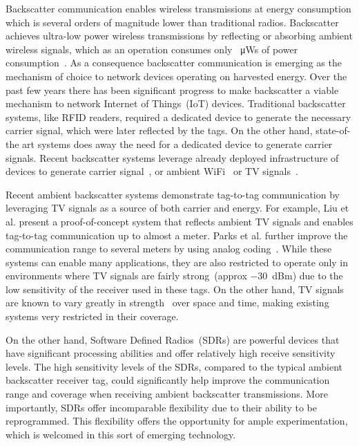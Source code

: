 Backscatter communication enables wireless transmissions
at energy consumption which is several orders of magnitude
lower than traditional radios. Backscatter achieves ultra-low
power wireless transmissions by reflecting or absorbing ambient
wireless signals, which as an operation consumes only 
\SI{}{\micro\watt}s of power consumption~\cite{liu_ambient_2013}. 
As a consequence backscatter
communication is emerging as the mechanism of choice to network
devices operating on harvested energy.  
Over the past few years there has been significant progress
to make backscatter a viable mechanism to network Internet of
Things~(IoT) devices. Traditional backscatter systems, like RFID readers, required a
dedicated device to generate the necessary carrier signal, which were later
reflected by the tags. On the other hand, state-of-the art systems 
does away the need for a dedicated device to generate carrier signals. 
Recent backscatter systems leverage already deployed infrastructure of
devices to generate carrier signal~\cite{varshney2016lorea,iyer2016inter}, or ambient WiFi~\cite{zhang2016hitchhike,kellogg2015wi} or TV
signals~\cite{liu_ambient_2013,parks_turbocharging_2014}.

Recent ambient backscatter systems demonstrate tag-to-tag communication
by leveraging TV signals as a source of both carrier and energy. For
example, Liu et al. present a proof-of-concept system that reflects
ambient TV signals and enables tag-to-tag communication up to almost a
meter. Parks et al. further improve the communication range to several
meters by using analog coding~\cite{parks_turbocharging_2014}. While
these systems can enable many applications, they are also restricted to
operate only in environments where TV signals are fairly strong~(approx
\SI{-30}{dBm}) due to the low sensitivity of the receiver used in these
tags. On the other hand, TV signals are known to vary greatly in
strength~\cite{wang_fm_2017} over space and time, making existing
systems very restricted in their coverage.

On the other hand, Software Defined Radios~(SDRs) are powerful devices
that have significant processing abilities and offer relatively high
receive sensitivity levels. The high sensitivity levels of the SDRs,
compared to the typical ambient backscatter receiver tag, could
significantly help improve the communication range and coverage when
receiving ambient backscatter transmissions. More importantly, SDRs
offer incomparable flexibility due to their ability to be reprogrammed.
This flexibility offers the opportunity for ample experimentation, which
is welcomed in this sort of emerging technology.

